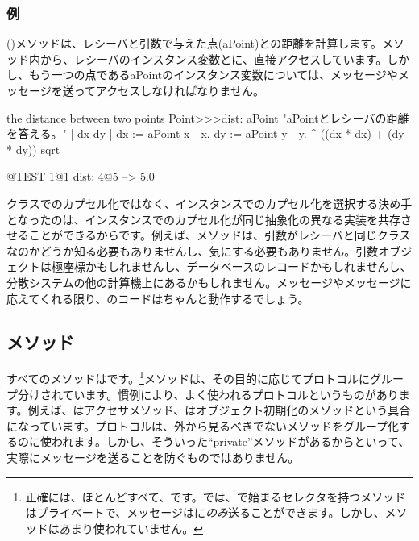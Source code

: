 \documentclass[a4paper,10pt,twoside]{book}
\begin{document}
\subsubsection{例}
 ()メソッドは、レシーバと引数で与えた点(aPoint)との距離を計算します。メソッド内から、レシーバのインスタンス変数とに、直接アクセスしています。しかし、もう一つの点であるaPointのインスタンス変数については、メッセージやメッセージを送ってアクセスしなければなりません。

\begin{method}[dist:]{the distance between two points}
Point>>>dist: aPoint 
	"aPointとレシーバの距離を答える。"  
	| dx dy |
	dx := aPoint x - x.
	dy :=  aPoint y - y.
	^ ((dx * dx) + (dy * dy)) sqrt
\end{method}

\begin{code}{@TEST}
1@1 dist: 4@5 --> 5.0
\end{code}

クラスでのカプセル化ではなく、インスタンスでのカプセル化を選択する決め手となったのは、インスタンスでのカプセル化が同じ抽象化の異なる実装を共存させることができるからです。例えば、メソッドは、引数がレシーバと同じクラスなのかどうか知る必要もありませんし、気にする必要もありません。引数オブジェクトは極座標かもしれませんし、データベースのレコードかもしれませんし、分散システムの他の計算機上にあるかもしれません。メッセージやメッセージに応えてくれる限り、のコードはちゃんと動作するでしょう。

\subsection{メソッド}

すべてのメソッドはです。\footnote{正確には、ほとんどすべて、です。\pharo では、で始まるセレクタを持つメソッドはプライベートで、メッセージは\self に\emph{のみ}送ることができます。しかし、メソッドはあまり使われていません。}メソッドは、その目的に応じてプロトコルにグループ分けされています。慣例により、よく使われるプロトコルというものがあります。例えば、はアクセサメソッド、はオブジェクト初期化のメソッドという具合になっています。プロトコルは、外から見るべきでないメソッドをグループ化するのに使われます。しかし、そういった``private''メソッドがあるからといって、実際にメッセージを送ることを防ぐものではありません。
\end{document}
